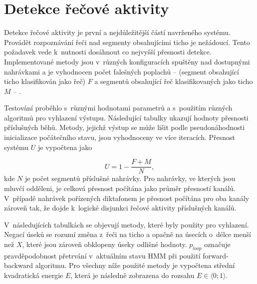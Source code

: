 \section{Detekce řečové aktivity}
\label{section:VAD_testing}
Detekce řečové aktivity je první a nejdůležitější částí navrženého systému. Provádět rozpoznávání řeči nad segmenty obsahujícími ticho je nežádoucí. Tento požadavek vede k~nutnosti dosáhnout co nejvyšší přesnosti detekce. Implementované metody jsou v~různých konfiguracích spuštěny nad dostupnými nahrávkami a je vyhodnocen počet falešných poplachů --  (segment obsahující ticho klasifikován jako řeč) $F$ a segmentů obsahující řeč klasifikovaných jako ticho $M$ -- . 

Testování proběhlo s~různými hodnotami parametrů a s~použitím různých algoritmů pro vyhlazení výstupu. Následující tabulky ukazují hodnoty přesnosti příslušných běhů. Metody, jejichž výstup se může lišit podle pseudonáhodnosti inicializace počátečního stavu, jsou vyhodnoceny ve více iteracích. Přesnost systému $U$ je vypočtena jako

\begin{equation}
    \label{eqn:VAD_Accuracy}
    U = 1 - \frac{F + M}{N},
\end{equation}
kde $N$ je počet segmentů příslušné nahrávky. Pro nahrávky, ve kterých jsou mluvčí odděleni, je celková přesnost počítána jako průměr přesností kanálů. V~případě nahrávek pořízených diktafonem je přesnost počítána pro oba kanály zároveň tak, že dojde k~logické disjunkci řečové aktivity příslušných kanálů.

V~následujících tabulkách se objevují metody, které byly použity pro vyhlazení. Negací úseků se rozumí změna z~řeči na ticho a opačně na úsecích o~délce menší než $X$, které jsou zároveň obklopeny úseky odlišné hodnoty. $p_{loop}$ označuje pravděpodobnost přetrvání v~aktuálním stavu HMM při použití forward-backward algoritmu. Pro všechny níže použité metody je vypočtena střední kvadratická energie $E$, která je následně zobrazena do rozsahu $E \in \langle0;1\rangle$.


